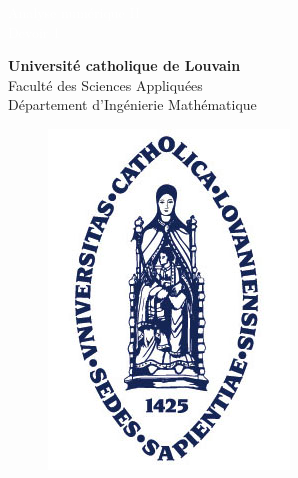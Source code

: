 \begin{titlepage}
\centering
\BgThispage
{}
\vspace*{2.5cm}
\noindent
\textcolor{white}{\bigsf Analyse numérique II \\ {\vspace{0.5cm} \huge Devoir 1}}
\vspace*{2.5cm}\par
\noindent
%
\begin{center}
\vspace{-1cm}
\textbf{\Large Université catholique de Louvain}  \\
Faculté des Sciences Appliquées \\
Département d’Ingénierie Mathématique \\
\vspace*{0.5cm}
\begin{figure}[!h]
	\centering
	\includegraphics[scale=0.7]{images/logo.jpg}
\end{figure}
\end{center}


\end{titlepage}
